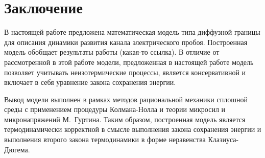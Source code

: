 \documentclass[a4paper,12pt]{article}
\theoremstyle{plain}
\theoremstyle{remark}
\begin{document}
\newpage


\section{Заключение}

В настоящей работе предложена математическая модель
типа диффузной границы для описания динамики развития канала
электрического
пробоя. Построенная модель обобщает результаты
работы \cite{zipunova_higher_codimension} (какая-то ссылка). В отличие от рассмотренной в этой работе
модели,
предложенная в настоящей работе модель
позволяет учитывать неизотермические процессы,
является консервативной и включает в себя
уравнение закона сохранения энергии.

Вывод модели выполнен в рамках методов рациональной механики сплошной
среды с применением процедуры Колмана-Нолла и теории микросил и
микронапряжений М.~Гуртина. Таким образом, построенная модель является
термодинамически корректной в смысле выполнения закона сохранения
энергии  и выполнения второго закона термодинамики
в форме неравенства Клазиуса-Дюгема.


\newpage
\printbibliography


\newpage
\tableofcontents
\end{document}

